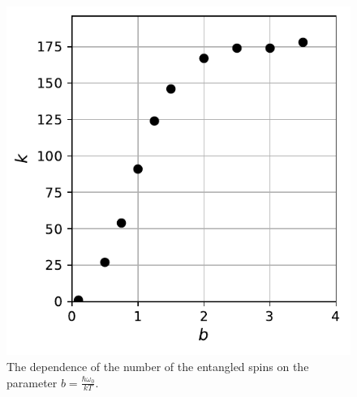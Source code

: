 \documentclass[%
 reprint,
superscriptaddress,
 amsmath,amssymb,
]{revtex4-2}
\begin{document}
\begin{figure}
    \centering
    \includegraphics{k_b.pdf}
    \caption{The dependence of the number of the entangled spins on the parameter $b = \frac{\hbar\omega_0}{kT} $.}
    \label{fig:k_b}
\end{figure}
\end{document}
